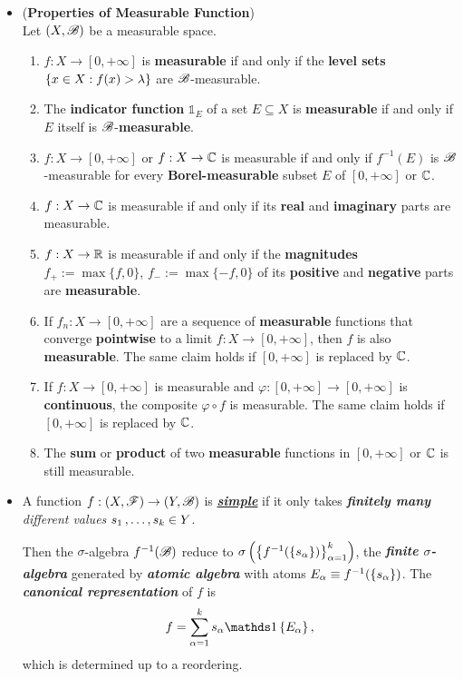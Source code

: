 \documentclass[11pt]{article}
\begin{document}
\begin{itemize}
\item \begin{proposition} (\textbf{Properties of Measurable Function})\\
Let $(X, {\mathscr B})$ be a measurable space.
\begin{enumerate}
\item $f : X \rightarrow [0, +\infty]$ is \textbf{measurable} if and only if the \textbf{level sets} $\left\{x \in X : f(x) > \lambda\right\}$ are ${\mathscr B}$-measurable.
\item The \textbf{indicator function} $\mathds{1}_E$ of a set $E \subseteq X$ is \textbf{measurable} if and only if $E$ itself is ${\mathscr B}$-\textbf{measurable}.
\item $f : X \rightarrow [0, +\infty]$ or $f: X \rightarrow {\mathbb C}$ is measurable if and only if $f^{-1}(E)$ is ${\mathscr B}$-measurable for every \textbf{Borel-measurable} subset $E$ of $[0, +\infty]$ or ${\mathbb C}$.
\item $f: X \rightarrow {\mathbb C}$ is measurable if and only if its \textbf{real} and \textbf{imaginary} parts are measurable.
\item $f: X \rightarrow {\mathbb R}$ is measurable if and only if the \textbf{magnitudes} $f_{+} := \max\{f, 0\}$, $f_{-} := \max\{-f, 0\}$ of its \textbf{positive} and \textbf{negative} parts are \textbf{measurable}.
\item  If $f_n : X \rightarrow [0, +\infty]$ are a sequence of \textbf{measurable} functions that converge \textbf{pointwise} to a limit $f : X \rightarrow [0, +\infty]$, then $f$ is also \textbf{measurable}. The same claim holds if $[0, +\infty]$ is replaced by ${\mathbb C}$.
\item  If $f : X \rightarrow [0, +\infty]$ is measurable and $\varphi: [0, +\infty] \rightarrow [0, +\infty]$ is \textbf{continuous}, the composite $\varphi \circ f$ is measurable. The same claim holds if $[0, +\infty]$ is replaced by ${\mathbb C}$.
\item The \textbf{sum} or \textbf{product} of two \textbf{measurable} functions in $[0, +\infty]$ or ${\mathbb C}$ is still measurable.
\end{enumerate}
\end{proposition}

\item  \begin{definition} 
A function $f: (X,{\mathscr F})\rightarrow (Y,{\mathscr B})$ is \underline{\emph{\textbf{simple}}} if it only takes \emph{\textbf{finitely many} different values} $s_{1} \,{,}\ldots{,}\, s_{k}\in Y$.  

Then the $\sigma$-algebra $f^{-1}({\mathscr B})$ reduce to $\sigma\left(\left\{f^{-1}(\left\{s_{\alpha}\right\})\right\}_{\alpha=1}^{k}\right)$, the \emph{\textbf{finite $\sigma$-algebra}} generated by \emph{\textbf{atomic algebra}} with atoms $E_{\alpha}\equiv f^{-1}(\left\{s_{\alpha}\right\})$. The \emph{\textbf{canonical representation}} of $f$ is 
\begin{align*}
f = \sum_{\alpha=1}^{k}s_{\alpha}\ind{E_{\alpha}},
\end{align*}
which is determined up to a reordering.
\end{definition}


\end{itemize}
\end{document}
